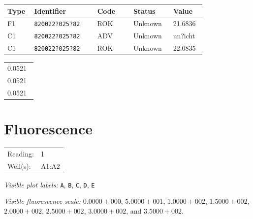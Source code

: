 \documentclass[UTF8,10pt,a4paper,fontset=fandol]{ctexart}
\begin{document}
\begin{center}
\small
\begin{tabular}{p{0.08\linewidth}p{0.28\linewidth}p{0.16\linewidth}p{0.16\linewidth}p{0.12\linewidth}}
\hline
Type & Identifier & Code & Status & Value \\
\hline
F1 & \texttt{820022?025?82} & ROK & Unknown & 21.6836 \\
C1 & \texttt{820022?025?82} & ADV & Unknown & un?icht \\
C1 & \texttt{820022?025?82} & ROK & Unknown & 22.0835 \\
\hline
\end{tabular}

\vspace{0.5em}

\begin{tabular}{p{0.12\linewidth}}
0.0521 \\
0.0521 \\
0.0521 \\
\end{tabular}
\end{center}

\newpage

\section{Fluorescence}

\begin{center}
\end{center}

\noindent
\begin{tabular}{@{}ll@{}}
Reading: & 1\\
Well(s): & A1:A2
\end{tabular}

\noindent
\textit{Visible plot labels:} \texttt{A}, \texttt{B}, \texttt{C}, \texttt{D}, \texttt{E}

\noindent
\textit{Visible fluorescence scale:}
$0.0000+000$, $5.0000+001$, $1.0000+002$, $1.5000+002$,
$2.0000+002$, $2.5000+002$, $3.0000+002$, and $3.5000+002$.
\end{document}
